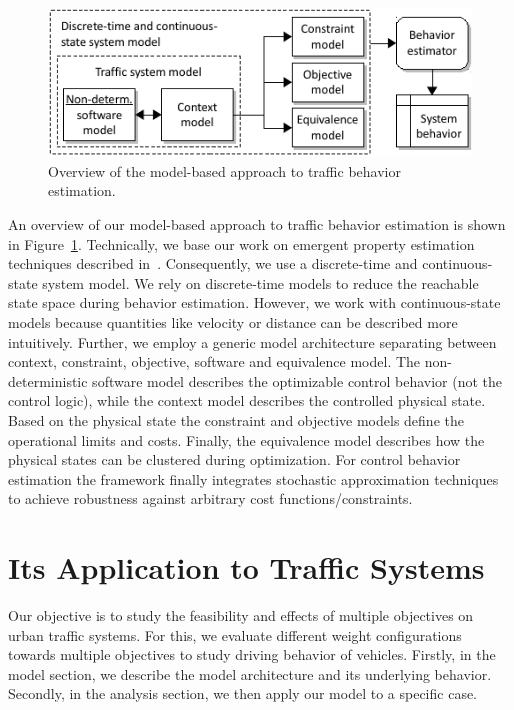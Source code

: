 \documentclass[conference]{../cls/IEEEtran}
\begin{document}
\begin{figure}[b]
	\centering
	\includegraphics{../gfx/framework.pdf}
	\caption{Overview of the model-based approach to traffic behavior estimation.}
	\label{fig:framework}
\end{figure}
An overview of our model-based approach to traffic behavior estimation is shown in Figure~\ref{fig:framework}. Technically, we base our work on emergent property estimation techniques described in~\cite{Hackenberg2012}. Consequently, we use a discrete-time and continuous-state system model. We rely on discrete-time models to reduce the reachable state space during behavior estimation. However, we work with continuous-state models because quantities like velocity or distance can be described more intuitively. Further, we employ a generic model architecture separating between context, constraint, objective, software and equivalence model. The non-deterministic software model describes the optimizable control behavior (not the control logic), while the context model describes the controlled physical state. Based on the physical state the constraint and objective models define the operational limits and costs. Finally, the equivalence model describes how the physical states can be clustered during optimization. For control behavior estimation the framework finally integrates stochastic approximation techniques~\cite{Pereira1991} to achieve robustness against arbitrary cost functions/constraints.

\section{Its Application to Traffic Systems}

Our objective is to study the feasibility and effects of multiple objectives on
urban traffic systems. For this, we evaluate different weight configurations
towards multiple objectives to study driving behavior of vehicles. Firstly, in
the model section, we describe the model architecture and its underlying
behavior. Secondly, in the analysis section, we then apply our model to a
specific case.
\end{document}
